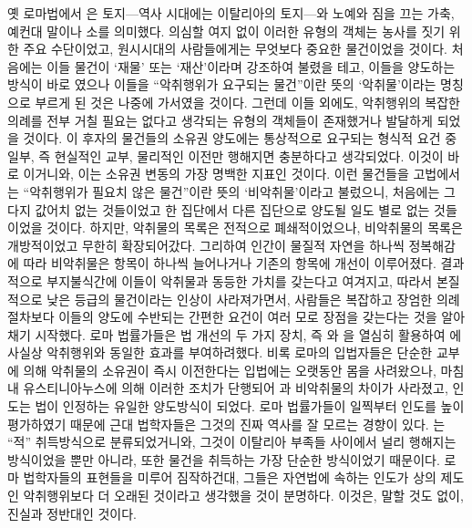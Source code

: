 옛 로마법에서 은 토지---역사 시대에는 이탈리아의 토지---와
노예와 짐을 끄는 가축, 예컨대 말이나 소를 의미했다.
의심할 여지 없이 이러한 유형의 객체는 농사를 짓기 위한 주요 수단이었고,
원시시대의 사람들에게는 무엇보다 중요한 물건이었을 것이다.
처음에는 이들 물건이 `재물' 또는 `재산'이라며 강조하여 불렸을 테고,
이들을 양도하는 방식이 바로 였으나
이들을 ``악취행위가 요구되는 물건''이란 뜻의
`악취물'이라는 명칭으로 부르게 된 것은 나중에 가서였을 것이다.
그런데 이들 외에도,
악취행위의 복잡한 의례를 전부 거칠 필요는 없다고 생각되는
유형의 객체들이 존재했거나 발달하게 되었을 것이다.
이 후자의 물건들의 소유권 양도에는
통상적으로 요구되는 형식적 요건 중 일부,
즉 현실적인 교부, 물리적인 이전만 행해지면 충분하다고 생각되었다.
이것이 바로 이거니와,
이는 소유권 변동의 가장 명백한 지표인 것이다.
이런 물건들을 고법에서는
``악취행위가 필요치 않은 물건''이란 뜻의
`비악취물'이라고 불렀으니,
처음에는 그다지 값어치 없는 것들이었고
한 집단에서 다른 집단으로 양도될 일도 별로 없는 것들이었을 것이다.
하지만, 악취물의 목록은 전적으로 폐쇄적이었으나,
비악취물의 목록은 개방적이었고 무한히 확장되어갔다.
그리하여 인간이 물질적 자연을 하나씩 정복해감에 따라
비악취물은 항목이 하나씩 늘어나거나
기존의 항목에 개선이 이루어졌다.
결과적으로 부지불식간에
이들이 악취물과 동등한 가치를 갖는다고 여겨지고, 따라서
본질적으로 낮은 등급의 물건이라는 인상이 사라져가면서,
사람들은 복잡하고 장엄한 의례절차보다
이들의 양도에 수반되는 간편한 요건이 여러 모로 장점을 갖는다는 것을
알아채기 시작했다.
로마 법률가들은
법 개선의 두 가지 장치,
즉 와 을
열심히 활용하여
에 사실상 악취행위와 동일한 효과를 부여하려했다.
비록 로마의 입법자들은
단순한 교부에 의해
악취물의 소유권이
즉시 이전한다는 입법에는
오랫동안 몸을 사려왔으나,
마침내 유스티니아누스에 의해 이러한 조치가 단행되어
과 비악취물의 차이가 사라졌고,
인도는 법이 인정하는 유일한 양도방식이 되었다.
로마 법률가들이 일찍부터
인도를 높이 평가하였기 때문에
근대 법학자들은 그것의 진짜 역사를 잘 모르는 경향이 있다.
는 ``적'' 취득방식으로 분류되었거니와,
그것이 이탈리아 부족들 사이에서 널리 행해지는 방식이었을 뿐만 아니라,
또한 물건을 취득하는 가장 단순한 방식이었기 때문이다.
로마 법학자들의 표현들을 미루어 짐작하건대,
그들은 자연법에 속하는 인도가 상의 제도인 악취행위보다
더 오래된 것이라고 생각했을 것이 분명하다.
이것은, 말할 것도 없이, 진실과 정반대인 것이다.


